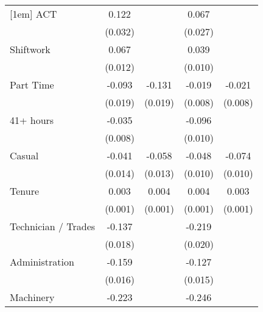 {\begin{tabular}{l*{4}{c}}
[1em]
ACT                 &       0.122\sym{***}&                     &       0.067\sym{*}  &                     \\
                    &     (0.032)         &                     &     (0.027)         &                     \\
[1em]
Shiftwork           &       0.067\sym{***}&                     &       0.039\sym{***}&                     \\
                    &     (0.012)         &                     &     (0.010)         &                     \\
[1em]
Part Time           &      -0.093\sym{***}&      -0.131\sym{***}&      -0.019\sym{*}  &      -0.021\sym{**} \\
                    &     (0.019)         &     (0.019)         &     (0.008)         &     (0.008)         \\
[1em]
41+ hours           &      -0.035\sym{***}&                     &      -0.096\sym{***}&                     \\
                    &     (0.008)         &                     &     (0.010)         &                     \\
[1em]
Casual              &      -0.041\sym{**} &      -0.058\sym{***}&      -0.048\sym{***}&      -0.074\sym{***}\\
                    &     (0.014)         &     (0.013)         &     (0.010)         &     (0.010)         \\
[1em]
Tenure              &       0.003\sym{***}&       0.004\sym{***}&       0.004\sym{***}&       0.003\sym{***}\\
                    &     (0.001)         &     (0.001)         &     (0.001)         &     (0.001)         \\
[1em]
Technician / Trades &      -0.137\sym{***}&                     &      -0.219\sym{***}&                     \\
                    &     (0.018)         &                     &     (0.020)         &                     \\
[1em]
Administration      &      -0.159\sym{***}&                     &      -0.127\sym{***}&                     \\
                    &     (0.016)         &                     &     (0.015)         &                     \\
[1em]
Machinery           &      -0.223\sym{***}&                     &      -0.246\sym{***}&                     \\

\end{tabular}}
